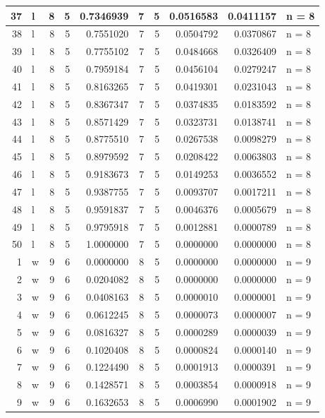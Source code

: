 \documentclass[
  letterpaper,
  DIV=11,
  numbers=noendperiod]{scrreprt}
\begin{document}
\begin{table}
\begin{tabular}[t]{r|l|r|r|r|r|r|r|r|l}
\hline
37 & l & 8 & 5 & 0.7346939 & 7 & 5 & 0.0516583 & 0.0411157 & n = 8\\
\hline
38 & l & 8 & 5 & 0.7551020 & 7 & 5 & 0.0504792 & 0.0370867 & n = 8\\
\hline
39 & l & 8 & 5 & 0.7755102 & 7 & 5 & 0.0484668 & 0.0326409 & n = 8\\
\hline
40 & l & 8 & 5 & 0.7959184 & 7 & 5 & 0.0456104 & 0.0279247 & n = 8\\
\hline
41 & l & 8 & 5 & 0.8163265 & 7 & 5 & 0.0419301 & 0.0231043 & n = 8\\
\hline
42 & l & 8 & 5 & 0.8367347 & 7 & 5 & 0.0374835 & 0.0183592 & n = 8\\
\hline
43 & l & 8 & 5 & 0.8571429 & 7 & 5 & 0.0323731 & 0.0138741 & n = 8\\
\hline
44 & l & 8 & 5 & 0.8775510 & 7 & 5 & 0.0267538 & 0.0098279 & n = 8\\
\hline
45 & l & 8 & 5 & 0.8979592 & 7 & 5 & 0.0208422 & 0.0063803 & n = 8\\
\hline
46 & l & 8 & 5 & 0.9183673 & 7 & 5 & 0.0149253 & 0.0036552 & n = 8\\
\hline
47 & l & 8 & 5 & 0.9387755 & 7 & 5 & 0.0093707 & 0.0017211 & n = 8\\
\hline
48 & l & 8 & 5 & 0.9591837 & 7 & 5 & 0.0046376 & 0.0005679 & n = 8\\
\hline
49 & l & 8 & 5 & 0.9795918 & 7 & 5 & 0.0012881 & 0.0000789 & n = 8\\
\hline
50 & l & 8 & 5 & 1.0000000 & 7 & 5 & 0.0000000 & 0.0000000 & n = 8\\
\hline
1 & w & 9 & 6 & 0.0000000 & 8 & 5 & 0.0000000 & 0.0000000 & n = 9\\
\hline
2 & w & 9 & 6 & 0.0204082 & 8 & 5 & 0.0000000 & 0.0000000 & n = 9\\
\hline
3 & w & 9 & 6 & 0.0408163 & 8 & 5 & 0.0000010 & 0.0000001 & n = 9\\
\hline
4 & w & 9 & 6 & 0.0612245 & 8 & 5 & 0.0000073 & 0.0000007 & n = 9\\
\hline
5 & w & 9 & 6 & 0.0816327 & 8 & 5 & 0.0000289 & 0.0000039 & n = 9\\
\hline
6 & w & 9 & 6 & 0.1020408 & 8 & 5 & 0.0000824 & 0.0000140 & n = 9\\
\hline
7 & w & 9 & 6 & 0.1224490 & 8 & 5 & 0.0001913 & 0.0000391 & n = 9\\
\hline
8 & w & 9 & 6 & 0.1428571 & 8 & 5 & 0.0003854 & 0.0000918 & n = 9\\
\hline
9 & w & 9 & 6 & 0.1632653 & 8 & 5 & 0.0006990 & 0.0001902 & n = 9\\

\end{tabular}
\end{table}
\end{document}
